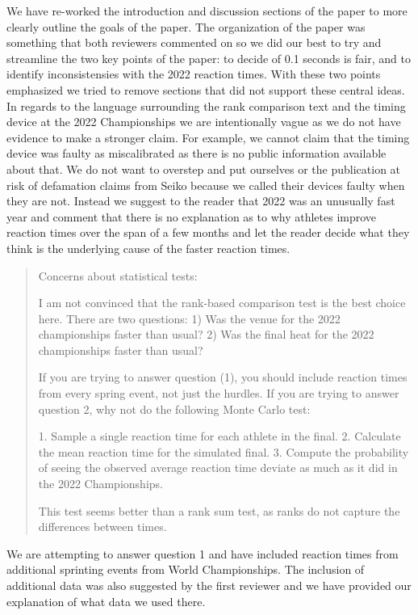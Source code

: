 \documentclass[12pt]{article}
\newenvironment{comment}%
{\begin{quotation}\noindent\small\it\color{darkblue}\ignorespaces%
}{\end{quotation}}
\begin{document}
We have re-worked the introduction and discussion sections of the paper to more
clearly outline the goals of the paper.  The organization of the paper was
something that both reviewers commented on so we did our best to try and
streamline the two key points of the paper: to decide of 0.1 seconds is fair,
and to identify inconsistensies with the 2022 reaction times. With these two
points emphasized we tried to remove sections that did not support these central
ideas.  In regards to the language surrounding the rank comparison text and the
timing device at the 2022 Championships we are intentionally vague as we do not
have evidence to make a stronger claim.  For example, we cannot claim that the
timing device was faulty as miscalibrated as there is no public information
available about that.  We do not want to overstep and put ourselves or the
publication at risk of defamation claims from Seiko because we called their
devices faulty when they are not.  Instead we suggest to the reader that 2022
was an unusually fast year and comment that there is no explanation as to why
athletes improve reaction times over the span of a few months and let the reader
decide what they think is the underlying cause of the faster reaction times.


\begin{comment}
Concerns about statistical tests:

I am not convinced that the rank-based comparison test is the best choice here.
There are two questions: 1) Was the venue for the 2022 championships faster than
usual? 2) Was the final heat for the 2022 championships faster than usual?

If you are trying to answer question (1), you should include reaction times from
every spring event, not just the hurdles. If you are trying to answer question
2, why not do the following Monte Carlo test:

1. Sample a single reaction time for each athlete in the final.
2. Calculate the mean reaction time for the simulated final.
3. Compute the probability of seeing the observed average reaction time deviate
as much as it did in the 2022 Championships.

This test seems better than a rank sum test, as ranks do not capture the
differences between times.

\end{comment}

We are attempting to answer question 1 and have included reaction times from
additional sprinting events from World Championships.  The inclusion of
additional data was also suggested by the first reviewer and we have provided
our explanation of what data we used there.
\end{document}
